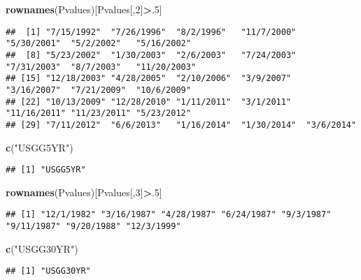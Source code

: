 \documentclass[]{article}
\newenvironment{Shaded}{\begin{snugshade}}{\end{snugshade}}
\newcommand{\KeywordTok}[1]{\textcolor[rgb]{0.13,0.29,0.53}{\textbf{#1}}}
\newcommand{\DecValTok}[1]{\textcolor[rgb]{0.00,0.00,0.81}{#1}}
\newcommand{\StringTok}[1]{\textcolor[rgb]{0.31,0.60,0.02}{#1}}
\newcommand{\OperatorTok}[1]{\textcolor[rgb]{0.81,0.36,0.00}{\textbf{#1}}}
\newcommand{\NormalTok}[1]{#1}
\begin{document}
\begin{Shaded}
\begin{Highlighting}[]
\KeywordTok{rownames}\NormalTok{(Pvalues)[Pvalues[,}\DecValTok{2}\NormalTok{]}\OperatorTok{>}\NormalTok{.}\DecValTok{5}\NormalTok{]}
\end{Highlighting}
\end{Shaded}

\begin{verbatim}
##  [1] "7/15/1992"  "7/26/1996"  "8/2/1996"   "11/7/2000"  "5/30/2001"  "5/2/2002"   "5/16/2002" 
##  [8] "5/23/2002"  "1/30/2003"  "2/6/2003"   "7/24/2003"  "7/31/2003"  "8/7/2003"   "11/20/2003"
## [15] "12/18/2003" "4/28/2005"  "2/10/2006"  "3/9/2007"   "3/16/2007"  "7/21/2009"  "10/6/2009" 
## [22] "10/13/2009" "12/28/2010" "1/11/2011"  "3/1/2011"   "11/16/2011" "11/23/2011" "5/23/2012" 
## [29] "7/11/2012"  "6/6/2013"   "1/16/2014"  "1/30/2014"  "3/6/2014"
\end{verbatim}

\begin{Shaded}
\begin{Highlighting}[]
\KeywordTok{c}\NormalTok{(}\StringTok{"USGG5YR"}\NormalTok{)}
\end{Highlighting}
\end{Shaded}

\begin{verbatim}
## [1] "USGG5YR"
\end{verbatim}

\begin{Shaded}
\begin{Highlighting}[]
\KeywordTok{rownames}\NormalTok{(Pvalues)[Pvalues[,}\DecValTok{3}\NormalTok{]}\OperatorTok{>}\NormalTok{.}\DecValTok{5}\NormalTok{]}
\end{Highlighting}
\end{Shaded}

\begin{verbatim}
## [1] "12/1/1982" "3/16/1987" "4/28/1987" "6/24/1987" "9/3/1987"  "9/11/1987" "9/20/1988" "12/3/1999"
\end{verbatim}

\begin{Shaded}
\begin{Highlighting}[]
\KeywordTok{c}\NormalTok{(}\StringTok{"USGG30YR"}\NormalTok{)}
\end{Highlighting}
\end{Shaded}

\begin{verbatim}
## [1] "USGG30YR"
\end{verbatim}
\end{document}
